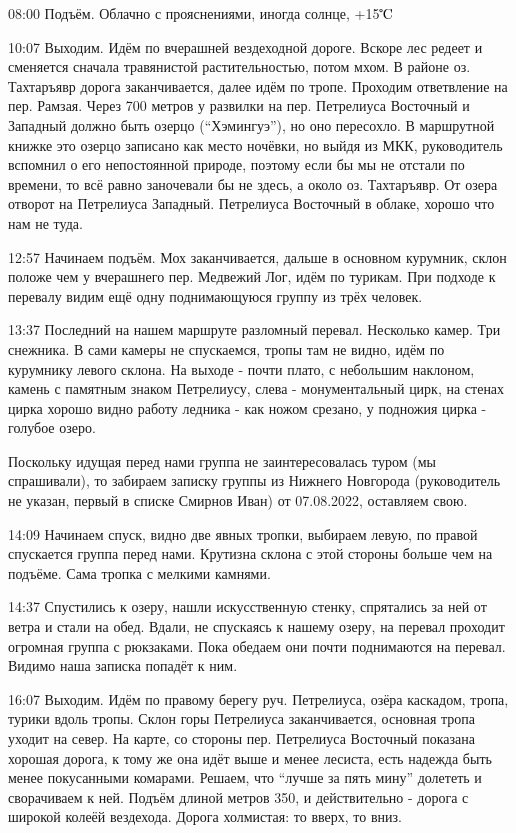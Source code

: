 08:00 Подъём.
Облачно с прояснениями, иногда солнце, +15$\tccentigrade$

10:07 Выходим.
Идём по вчерашней вездеходной дороге. Вскоре лес редеет и сменяется сначала травянистой растительностью, потом мхом.
В районе оз. Тахтаръявр дорога заканчивается, далее идём по тропе.
Проходим ответвление на пер. Рамзая. Через 700 метров у развилки на пер. Петрелиуса Восточный и Западный
должно быть озерцо (``Хэмингуэ''), но оно пересохло. В маршрутной книжке это озерцо записано как место ночёвки,
но выйдя из МКК, руководитель вспомнил о его непостоянной природе, поэтому если бы мы не отстали по времени,
то всё равно заночевали бы не здесь, а около оз. Тахтаръявр.
От озера отворот на Петрелиуса Западный. Петрелиуса Восточный в облаке, хорошо что нам не туда.

12:57 Начинаем подъём. Мох заканчивается, дальше в основном курумник, склон положе чем у вчерашнего пер. Медвежий Лог,
идём по турикам. При подходе к перевалу видим ещё одну поднимающуюся группу из трёх человек.

13:37 Последний на нашем маршруте разломный перевал. Несколько камер. Три снежника. В сами камеры не спускаемся,
тропы там не видно, идём по курумнику левого склона. На выходе - почти плато, с небольшим наклоном,
камень с памятным знаком Петрелиусу, слева - монументальный цирк, на стенах цирка хорошо видно
работу ледника - как ножом срезано, у подножия цирка - голубое озеро.

Поскольку идущая перед нами группа не заинтересовалась туром (мы спрашивали), то забираем записку группы из
Нижнего Новгорода (руководитель не указан, первый в списке Смирнов Иван) от 07.08.2022, оставляем свою.

14:09 Начинаем спуск, видно две явных тропки, выбираем левую, по правой спускается группа перед нами.
Крутизна склона с этой стороны больше чем на подъёме. Сама тропка с мелкими камнями.

14:37 Спустились к озеру, нашли искусственную стенку, спрятались за ней от ветра и стали на обед.
Вдали, не спускаясь к нашему озеру, на перевал проходит огромная группа с рюкзаками.
Пока обедаем они почти поднимаются на перевал. Видимо наша записка попадёт к ним.

16:07 Выходим.
Идём по правому берегу руч. Петрелиуса, озёра каскадом, тропа, турики вдоль тропы.
Склон горы Петрелиуса заканчивается, основная тропа уходит на север. На карте, со стороны пер. Петрелиуса Восточный
показана хорошая дорога, к тому же она идёт выше и менее лесиста, есть надежда быть менее покусанными комарами.
Решаем, что ``лучше за пять мину'' долететь и сворачиваем к ней.
Подъём длиной метров 350, и действительно - дорога с широкой колеёй вездехода. Дорога холмистая: то вверх, то вниз.

